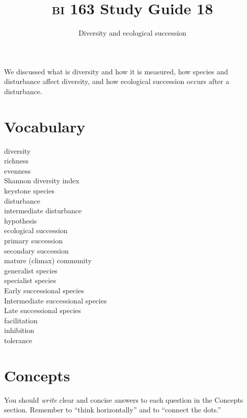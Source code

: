 \documentclass[letterpaper]{tufte-handout}
\title{{\scshape bi} 163 Study Guide 18}
\author{Diversity and ecological succession}
\date{} %
\begin{document}
\maketitle	%

We discussed what is diversity and how it is measured, how species and disturbance affect diversity, and how ecological succession occurs after a disturbance.

\section*{Vocabulary}

\vspace{-1\baselineskip}
\begin{multicols}{2}
diversity \\
richness \\
evenness \\
Shannon diversity index \\
keystone species \\
disturbance \\
intermediate disturbance\\ \hspace*{1em} hypothesis \\
ecological succession \\
primary succession \\
secondary succession \\
mature (climax) community \\
generalist species \\
specialist species \\
Early successional species \\
Intermediate successional species \\
Late successional species \\
facilitation \\
inhibition \\
tolerance
\end{multicols}

\section*{Concepts}

You should \emph{write} clear and concise answers to each question in the Concepts section.  Remember to ``think horizontally'' and to ``connect the dots.'' 
\end{document}
